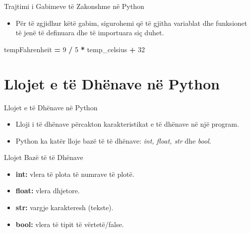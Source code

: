 \documentclass[
  ignorenonframetext,
]{beamer}
\newenvironment{Shaded}{\begin{snugshade}}{\end{snugshade}}
\newcommand{\DecValTok}[1]{\textcolor[rgb]{0.00,0.00,0.81}{#1}}
\newcommand{\NormalTok}[1]{#1}
\newcommand{\OperatorTok}[1]{\textcolor[rgb]{0.81,0.36,0.00}{\textbf{#1}}}
\providecommand{\tightlist}{%
  \setlength{\itemsep}{0pt}\setlength{\parskip}{0pt}}
\begin{document}
\begin{frame}[fragile]{Trajtimi i Gabimeve të Zakonshme në Python}
\protect\hypertarget{trajtimi-i-gabimeve-tuxeb-zakonshme-nuxeb-python-1}{}
\begin{itemize}
\tightlist
\item
  Për të zgjidhur këtë gabim, sigurohemi që të gjitha variablat dhe
  funksionet të jenë të definuara dhe të importuara siç duhet.
\end{itemize}

\begin{Shaded}
\begin{Highlighting}[]
\NormalTok{tempFahrenheit }\OperatorTok{=} \DecValTok{9} \OperatorTok{/} \DecValTok{5} \OperatorTok{*}\NormalTok{ temp\_celsius }\OperatorTok{+} \DecValTok{32}
\end{Highlighting}
\end{Shaded}
\end{frame}

\hypertarget{llojet-e-tuxeb-dhuxebnave-nuxeb-python}{%
\section*{Llojet e të Dhënave në
Python}\label{llojet-e-tuxeb-dhuxebnave-nuxeb-python}}

\begin{frame}{Llojet e të Dhënave në Python}
\protect\hypertarget{llojet-e-tuxeb-dhuxebnave-nuxeb-python-1}{}
\begin{itemize}
\item
  Lloji i të dhënave përcakton karakteristikat e të dhënave në një
  program.
\item
  Python ka katër lloje bazë të të dhënave: \emph{int, float, str} dhe
  \emph{bool}.
\end{itemize}
\end{frame}

\begin{frame}{Llojet Bazë të të Dhënave}
\protect\hypertarget{llojet-bazuxeb-tuxeb-tuxeb-dhuxebnave}{}
\begin{itemize}
\item
  \textbf{int:} vlera të plota të numrave të plotë.
\item
  \textbf{float:} vlera dhjetore.
\item
  \textbf{str:} vargje karakteresh (tekste).
\item
  \textbf{bool:} vlera të tipit të vërtetë/false.
\end{itemize}
\end{frame}
\end{document}
